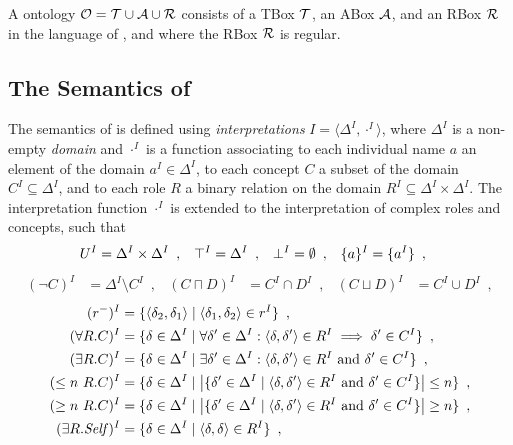 
\begin{definition}
A \SROIQ  ontology $\mathcal{O} = \mathcal{T} \cup \mathcal{A} \cup \mathcal{R}$ consists of a TBox $\mathcal{T}$, an ABox $\mathcal{A}$, and an RBox $\mathcal{R}$ in the language of \SROIQ, and where the RBox $\mathcal{R}$ is regular.
\end{definition}

\subsection{The Semantics of \SROIQ} \label{sroiq-semantics}

The semantics of \SROIQ is defined using \emph{interpretations} $I = \langle \Delta^I, \cdot^I \rangle$, where $\Delta^I$ is a non-empty \emph{domain} and $\cdot^I$ is a function associating to each individual name $a$ an element of the domain $a^I \in \Delta^I$, to each concept $C$ a subset of the domain $C^I \subseteq \Delta^I$, and to each role $R$ a binary relation on the domain $R^I \subseteq \Delta^I \times \Delta^I$. The interpretation function $\cdot^I$ is extended to the interpretation of complex roles and concepts, such that
\begin{align*}
  U^I &= \Delta^I \times \Delta^I \enspace, &
  \top^I &= \Delta^I \enspace, &
  \bot^I &= \emptyset \enspace, &
  \{a\}^I &= \{ a^I \} \enspace,
\end{align*}
\vspace{-9mm}
\begin{align*}
  (\lnot C)^I &= \Delta^I \setminus C^I \enspace, &
  (C \sqcap D)^I &= C^I \cap D^I \enspace, &
  (C \sqcup D)^I &= C^I \cup D^I \enspace,
\end{align*} 
\vspace{-9mm}
\begin{align*}
  (r^-)^I &= \{ \langle \delta_2, \delta_1 \rangle \mid \langle \delta_1, \delta_2 \rangle \in r^I \} \enspace, \\
  (\forall R.C)^I &= \{ \delta \in \Delta^I \mid \forall \delta' \in \Delta^I : \langle \delta, \delta' \rangle \in R^I \implies \delta' \in C^I \} \enspace, \\
  (\exists R.C)^I &= \{ \delta \in \Delta^I \mid \exists \delta' \in \Delta^I : \langle \delta, \delta' \rangle \in R^I \text{ and } \delta' \in C^I \} \enspace, \\
  (\leq n~R.C)^I &= \{ \delta \in \Delta^I \mid \left| \{ \delta' \in \Delta^I \mid \langle \delta, \delta' \rangle \in R^I \text{ and } \delta' \in C^I \} \right| \leq n \} \enspace, \\
  (\geq n~R.C)^I &= \{ \delta \in \Delta^I \mid \left| \{ \delta' \in \Delta^I \mid \langle \delta, \delta' \rangle \in R^I \text{ and } \delta' \in C^I \} \right| \geq n \} \enspace, \\
  (\exists R.\mathit{Self})^I &= \{ \delta \in \Delta^I \mid \langle \delta, \delta \rangle \in R^I \} \enspace,
\end{align*}
